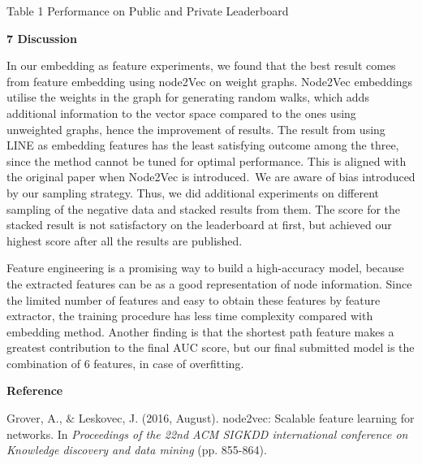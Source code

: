 \documentclass[12pt]{article}
\renewcommand{\_}{\kern-1.5pt\textunderscore\kern-1.5pt}
\begin{document}
\vspace{\baselineskip}
\begin{Center}
Table 1 Performance on Public and Private Leaderboard
\end{Center}
\setlength{\parskip}{3.96pt}
{\fontsize{13pt}{15.6pt}\selectfont \textbf{7 Discussion }}
\begin{justify}
In our embedding as feature experiments, we found that the best result comes from feature embedding using node2Vec on weight graphs. Node2Vec embeddings utilise the weights in the graph for generating random walks, which adds additional information to the vector space compared to the ones using unweighted graphs, hence the improvement of results. The result from using LINE as embedding features has the least satisfying outcome among the three, since the method cannot be tuned for optimal performance. This is aligned with the original paper when Node2Vec is introduced. We are aware of bias introduced by our sampling strategy. Thus, we did additional experiments on different sampling of the negative data and stacked results from them. The score for the stacked result is not satisfactory on the leaderboard at first, but achieved our highest score after all the results are published.  
\end{justify}
\begin{justify}
Feature engineering is a promising way to build a high-accuracy model, because the extracted features can be as a good representation of node information. Since the limited number of features and easy to obtain these features by feature extractor, the training procedure has less time complexity compared with embedding method. Another finding is that the shortest path feature makes a greatest contribution to the final AUC score, but our final submitted model is the combination of 6 features, in case of overfitting.
\end{justify}

\vspace{\baselineskip}
\begin{justify}
{\fontsize{14pt}{16.8pt}\selectfont \textbf{Reference }}
\end{justify}
\begin{justify}
\textcolor[HTML]{222222}{Grover, A., $\&$  Leskovec, J. (2016, August). node2vec: Scalable feature learning for networks. In \textit{Proceedings of the 22nd ACM SIGKDD international conference on Knowledge discovery and data mining} (pp. 855-864).}
\end{justify}
\end{document}
